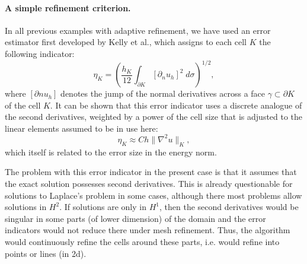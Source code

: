 \documentclass{article}
\begin{document}
\paragraph{A simple refinement criterion.}
In all previous examples with adaptive refinement, we have used an
error estimator first developed by Kelly et al., which assigns to each
cell $K$ the following indicator:
$$
  \eta_K =
  \left(
    \frac {h_K}{12}
    \int_{\partial K}
      [\partial_n u_h]^2 \; d\sigma
  \right)^{1/2},
$$
where $[\partial n u_h]$ denotes the jump of the normal derivatives
across a face $\gamma\subset\partial K$ of the cell $K$. It can be
shown that this error indicator uses a discrete analogue of the second
derivatives, weighted by a power of the cell size that is adjusted to
the linear elements assumed to be in use here:
$$
  \eta_K \approx 
  C h \| \nabla^2 u \|_K,
$$
which itself is related to the error size in the energy norm.

The problem with this error indicator in the present case is that it
assumes that the exact solution possesses second derivatives. This is
already questionable for solutions to Laplace's problem in some cases,
although there most problems allow solutions in $H^2$. If solutions
are only in $H^1$, then the second derivatives would be singular in
some parts (of lower dimension) of the domain and the error indicators
would not reduce there under mesh refinement. Thus, the algorithm
would continuously refine the cells around these parts, i.e. would
refine into points or lines (in 2d).
\end{document}
